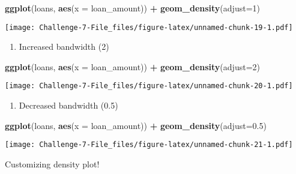\documentclass[
]{article}
\newenvironment{Shaded}{\begin{snugshade}}{\end{snugshade}}
\newcommand{\AttributeTok}[1]{\textcolor[rgb]{0.13,0.29,0.53}{#1}}
\newcommand{\DecValTok}[1]{\textcolor[rgb]{0.00,0.00,0.81}{#1}}
\newcommand{\FloatTok}[1]{\textcolor[rgb]{0.00,0.00,0.81}{#1}}
\newcommand{\FunctionTok}[1]{\textcolor[rgb]{0.13,0.29,0.53}{\textbf{#1}}}
\newcommand{\NormalTok}[1]{#1}
\newcommand{\SpecialCharTok}[1]{\textcolor[rgb]{0.81,0.36,0.00}{\textbf{#1}}}
\newcommand{\StringTok}[1]{\textcolor[rgb]{0.31,0.60,0.02}{#1}}
\providecommand{\tightlist}{%
  \setlength{\itemsep}{0pt}\setlength{\parskip}{0pt}}
\begin{document}
\begin{Shaded}
\begin{Highlighting}[]
\FunctionTok{ggplot}\NormalTok{(loans, }\FunctionTok{aes}\NormalTok{(}\AttributeTok{x =}\NormalTok{ loan\_amount)) }\SpecialCharTok{+}
\FunctionTok{geom\_density}\NormalTok{(}\AttributeTok{adjust=}\DecValTok{1}\NormalTok{)}
\end{Highlighting}
\end{Shaded}

\texttt{[image: Challenge-7-File\_files/figure-latex/unnamed-chunk-19-1.pdf]}

\begin{enumerate}
\def\labelenumi{\arabic{enumi}.}
\setcounter{enumi}{1}
\tightlist
\item
  Increased bandwidth (2)
\end{enumerate}

\begin{Shaded}
\begin{Highlighting}[]
\FunctionTok{ggplot}\NormalTok{(loans, }\FunctionTok{aes}\NormalTok{(}\AttributeTok{x =}\NormalTok{ loan\_amount)) }\SpecialCharTok{+}
\FunctionTok{geom\_density}\NormalTok{(}\AttributeTok{adjust=}\DecValTok{2}\NormalTok{)}
\end{Highlighting}
\end{Shaded}

\texttt{[image: Challenge-7-File\_files/figure-latex/unnamed-chunk-20-1.pdf]}

\begin{enumerate}
\def\labelenumi{\arabic{enumi}.}
\setcounter{enumi}{2}
\tightlist
\item
  Decreased bandwidth (0.5)
\end{enumerate}

\begin{Shaded}
\begin{Highlighting}[]
\FunctionTok{ggplot}\NormalTok{(loans, }\FunctionTok{aes}\NormalTok{(}\AttributeTok{x =}\NormalTok{ loan\_amount)) }\SpecialCharTok{+}
\FunctionTok{geom\_density}\NormalTok{(}\AttributeTok{adjust=}\FloatTok{0.5}\NormalTok{)}
\end{Highlighting}
\end{Shaded}

\texttt{[image: Challenge-7-File\_files/figure-latex/unnamed-chunk-21-1.pdf]}

Customizing density plot!

\begin{Shaded}
\end{Shaded}
\end{document}
